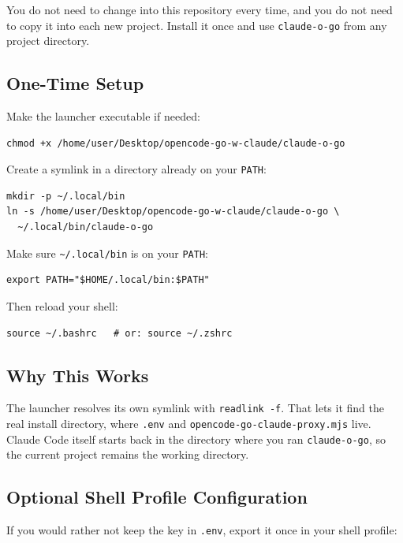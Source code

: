 \documentclass[11pt,a4paper]{article}
\newcommand{\code}[1]{\texttt{#1}}
\begin{document}
You do not need to change into this repository every time, and you do not need
to copy it into each new project. Install it once and use \code{claude-o-go}
from any project directory.

\subsection{One-Time Setup}

Make the launcher executable if needed:

\begin{verbatim}
chmod +x /home/user/Desktop/opencode-go-w-claude/claude-o-go
\end{verbatim}

Create a symlink in a directory already on your \code{PATH}:

\begin{verbatim}
mkdir -p ~/.local/bin
ln -s /home/user/Desktop/opencode-go-w-claude/claude-o-go \
  ~/.local/bin/claude-o-go
\end{verbatim}

Make sure \code{\textasciitilde{}/.local/bin} is on your \code{PATH}:

\begin{verbatim}
export PATH="$HOME/.local/bin:$PATH"
\end{verbatim}

Then reload your shell:

\begin{verbatim}
source ~/.bashrc   # or: source ~/.zshrc
\end{verbatim}

\subsection{Why This Works}

The launcher resolves its own symlink with \code{readlink -f}. That lets it
find the real install directory, where \code{.env} and
\code{opencode-go-claude-proxy.mjs} live. Claude Code itself starts back in the
directory where you ran \code{claude-o-go}, so the current project remains the
working directory.

\subsection{Optional Shell Profile Configuration}

If you would rather not keep the key in \code{.env}, export it once in your
shell profile:
\end{document}

